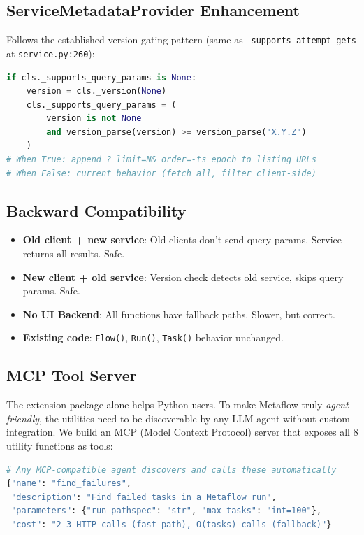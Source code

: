 \documentclass[11pt,a4paper]{article}
\begin{document}
\subsection{ServiceMetadataProvider Enhancement}

Follows the established version-gating pattern (same as \texttt{\_supports\_attempt\_gets} at \texttt{service.py:260}):

\begin{lstlisting}[language=Python]
if cls._supports_query_params is None:
    version = cls._version(None)
    cls._supports_query_params = (
        version is not None
        and version_parse(version) >= version_parse("X.Y.Z")
    )
# When True: append ?_limit=N&_order=-ts_epoch to listing URLs
# When False: current behavior (fetch all, filter client-side)
\end{lstlisting}

\subsection{Backward Compatibility}

\begin{itemize}[nosep]
    \item \textbf{Old client + new service}: Old clients don't send query params. Service returns all results. Safe.
    \item \textbf{New client + old service}: Version check detects old service, skips query params. Safe.
    \item \textbf{No UI Backend}: All functions have fallback paths. Slower, but correct.
    \item \textbf{Existing code}: \texttt{Flow()}, \texttt{Run()}, \texttt{Task()} behavior unchanged.
\end{itemize}


\subsection{MCP Tool Server}

The extension package alone helps Python users. To make Metaflow truly \textit{agent-friendly}, the utilities need to be discoverable by any LLM agent without custom integration. We build an MCP (Model Context Protocol) server that exposes all 8 utility functions as tools:

\begin{lstlisting}[language=Python]
# Any MCP-compatible agent discovers and calls these automatically
{"name": "find_failures",
 "description": "Find failed tasks in a Metaflow run",
 "parameters": {"run_pathspec": "str", "max_tasks": "int=100"},
 "cost": "2-3 HTTP calls (fast path), O(tasks) calls (fallback)"}
\end{lstlisting}
\end{document}
